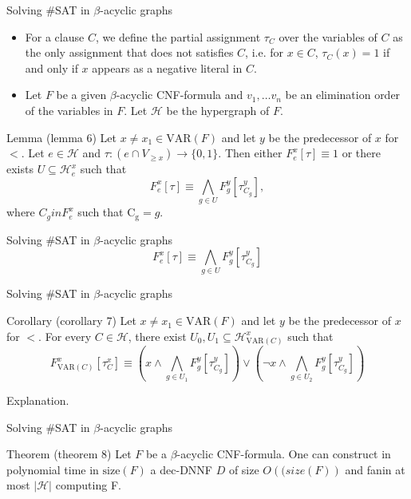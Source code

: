\begin{frame}[t]{Solving \#SAT in $\beta$-acyclic graphs}
	\begin{itemize}
		\item For a clause $C$, we define the partial assignment $\tau_C$ over the variables of $C$ as the only assignment that does not satisfies $C$, i.e. for $x \in C$, $\tau_C(x) = 1$ if and only if $x$ appears as a negative literal in $C$.

		\item Let $F$ be a given $\beta$-acyclic CNF-formula and $v_1, \dots v_n$ be an elimination order of the variables in $F$. Let $\mathcal{H}$ be the hypergraph of $F$.
	\end{itemize}
	\begin{block}{Lemma (lemma 6)}
		Let $x \neq x_1 \in \mathrm{VAR}(F)$ and let $y$ be the predecessor of $x$ for $<$.  Let $e \in \mathcal{H}$ and $\tau : (e \cap V_{\geq x}) \rightarrow \{0, 1\}$. Then either $F^x_e[\tau] \equiv 1$ or there exists $U \subseteq \mathcal{H}^x_e$ such that 
		$$ F^x_e[\tau] \equiv \bigwedge\limits_{g \in U} F^y_g[\tau^y_{C_g}],$$
		where $C_g in F^x_e$ such that $\mathrm{C_g} = g$.
	\end{block}
\end{frame}

\begin{frame}[t]{Solving \#SAT in $\beta$-acyclic graphs}
		$$ F^x_e[\tau] \equiv \bigwedge\limits_{g \in U} F^y_g[\tau^y_{C_g}]$$
\end{frame}

\begin{frame}[t]{Solving \#SAT in $\beta$-acyclic graphs}
	\begin{block}{Corollary (corollary 7)}
		Let $x \neq x_1 \in \mathrm{VAR}(F)$ and let $y$ be the predecessor of $x$ for $<$. For every $C \in \mathcal{H}$, there exist $U_0, U_1 \subseteq \mathcal{H}^x_{\mathrm{VAR}(C)}$ such that
		$$F^x_{\mathrm{VAR}(C)}[\tau^x_C] \equiv 
		( x \land \bigwedge\limits_{g \in U_1} F^y_g[\tau^y_{C_g}]) \lor
		( \lnot x \land \bigwedge\limits_{g \in U_2} F^y_g[\tau^y_{C_g}])
		$$
	\end{block}
	Explanation.
\end{frame}

\begin{frame}[t]{Solving \#SAT in $\beta$-acyclic graphs}
	\begin{block}{Theorem (theorem 8)}
		Let $F$ be a $\beta$-acyclic CNF-formula. One can construct in polynomial time in $\mathrm{size}(F)$ a dec-DNNF $D$ of size $O(\mathrm(size(F))$ and fanin at most $|\mathcal{H}|$ computing F.
	\end{block}
\end{frame}
